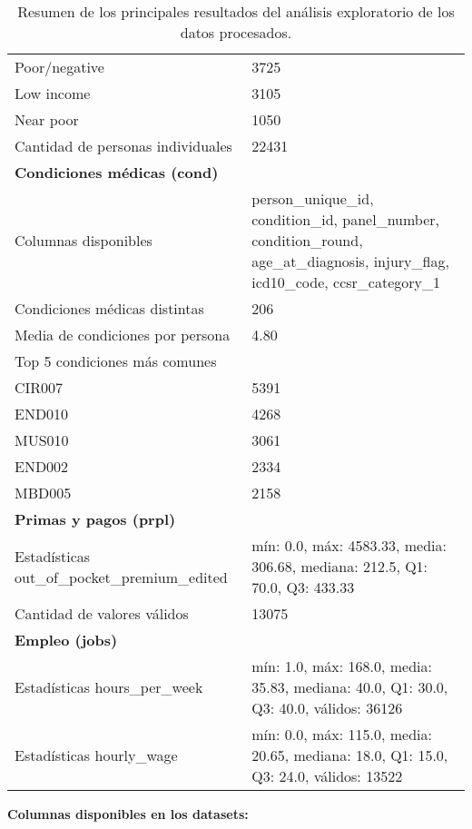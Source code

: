 \documentclass[12pt,a4paper]{article}
\begin{document}
\begin{table}[H]
\begin{tabular}{ll}
\quad Poor/negative & 3725 \\
\quad Low income & 3105 \\
\quad Near poor & 1050 \\
\midrule
Cantidad de personas individuales & 22431 \\
\midrule
\multicolumn{2}{l}{\textbf{Condiciones médicas (cond)}} \\
Columnas disponibles & person\_unique\_id, condition\_id, panel\_number, condition\_round, age\_at\_diagnosis, injury\_flag, icd10\_code, ccsr\_category\_1 \\
Condiciones médicas distintas & 206 \\
Media de condiciones por persona & 4.80 \\
Top 5 condiciones más comunes &  \\
\quad CIR007 & 5391 \\
\quad END010 & 4268 \\
\quad MUS010 & 3061 \\
\quad END002 & 2334 \\
\quad MBD005 & 2158 \\
\midrule
\multicolumn{2}{l}{\textbf{Primas y pagos (prpl)}} \\
Estadísticas out\_of\_pocket\_premium\_edited & mín: 0.0, máx: 4583.33, media: 306.68, mediana: 212.5, Q1: 70.0, Q3: 433.33 \\
Cantidad de valores válidos & 13075 \\
\midrule
\multicolumn{2}{l}{\textbf{Empleo (jobs)}} \\
Estadísticas hours\_per\_week & mín: 1.0, máx: 168.0, media: 35.83, mediana: 40.0, Q1: 30.0, Q3: 40.0, válidos: 36126 \\
Estadísticas hourly\_wage & mín: 0.0, máx: 115.0, media: 20.65, mediana: 18.0, Q1: 15.0, Q3: 24.0, válidos: 13522 \\
\bottomrule
\end{tabular}

\caption{Resumen de los principales resultados del análisis exploratorio de los datos procesados.}
\end{table}

\vspace{1em}
\noindent
\textbf{Columnas disponibles en los datasets:}
\end{document}
